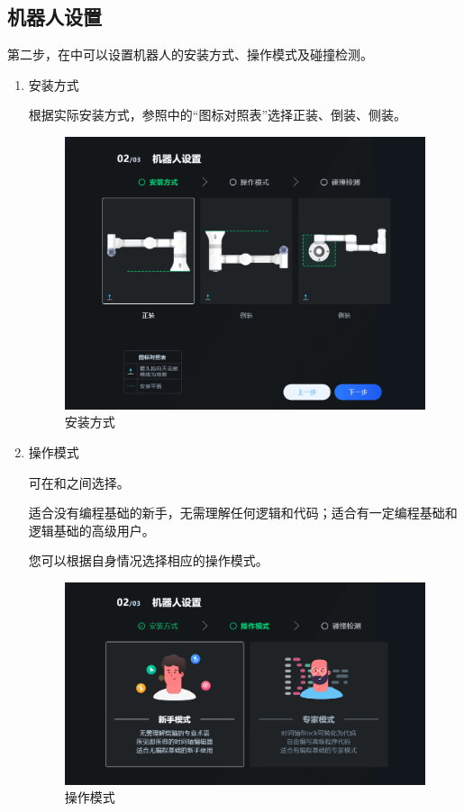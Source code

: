\subsection{机器人设置}
第二步，在中可以设置机器人的安装方式、操作模式及碰撞检测。
\begin{enumerate}
\item 安装方式

	根据实际安装方式，参照中的“图标对照表”选择正装、倒装、侧装。

	\begin{figure}[ht]
		\centering
		\includegraphics[width=\textwidth]{screen/2-6.png}
		\caption{安装方式}
		\label{fig:安装方式}
	\end{figure}


\clearpage

\item 操作模式

	可在和之间选择。
	
	适合没有编程基础的新手，无需理解任何逻辑和代码；适合有一定编程基础和逻辑基础的高级用户。
	
	您可以根据自身情况选择相应的操作模式。

	\begin{figure}[ht]
		\centering
		\includegraphics[width=\textwidth]{screen/2-7.png}
		\caption{操作模式}
		\label{fig:操作模式}
	\end{figure}


\end{enumerate}
